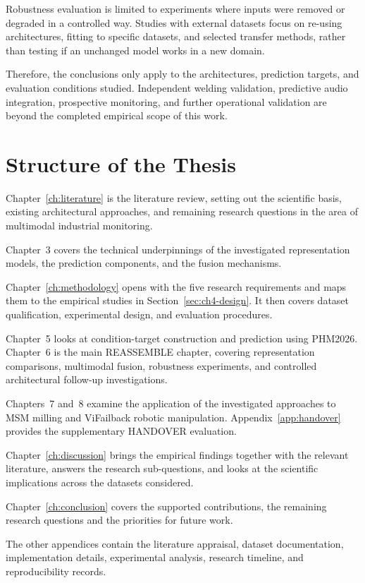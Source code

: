 Robustness evaluation is limited to experiments where inputs
were removed or degraded in a controlled way. Studies with
external datasets focus on re-using architectures, fitting to
specific datasets, and selected transfer methods, rather than
testing if an unchanged model works in a new domain.

Therefore, the conclusions only apply to the architectures,
prediction targets, and evaluation conditions studied. Independent
welding validation, predictive audio integration, prospective
monitoring, and further operational validation are beyond the
completed empirical scope of this work.



\section{Structure of the Thesis}

Chapter~\ref{ch:literature} is the literature review, setting out the scientific
basis, existing architectural approaches, and remaining research
questions in the area of multimodal industrial monitoring.

Chapter~3 covers the technical underpinnings of the investigated
representation models, the prediction components, and the fusion
mechanisms.

Chapter~\ref{ch:methodology} opens with the five research requirements and maps
them to the empirical studies in Section~\ref{sec:ch4-design}. It then covers
dataset qualification, experimental design, and evaluation procedures.

Chapter~5 looks at condition-target construction and prediction
using PHM2026. Chapter~6 is the main REASSEMBLE chapter, covering
representation comparisons, multimodal fusion, robustness
experiments, and controlled architectural follow-up investigations.

Chapters~7 and~8 examine the application of the investigated
approaches to MSM milling and ViFailback robotic manipulation.
Appendix~\ref{app:handover} provides the supplementary HANDOVER
evaluation.

Chapter~\ref{ch:discussion} brings the empirical findings together
with the relevant literature, answers the research sub-questions,
and looks at the scientific implications across the datasets
considered.

Chapter~\ref{ch:conclusion} covers the supported contributions,
the remaining research questions and the priorities for future work.

The other appendices contain the literature appraisal, dataset
documentation, implementation details, experimental analysis,
research timeline, and reproducibility records.
